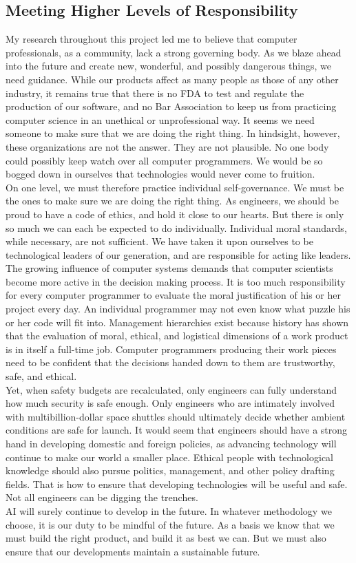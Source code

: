 \subsection{Meeting Higher Levels of Responsibility}
My research throughout this project led me to believe that computer professionals,
as a community, lack a strong governing body. As we blaze ahead into the future and
create new, wonderful, and possibly dangerous things, we need guidance. While our
products affect as many people as those of any other industry, it remains true that there is
no FDA to test and regulate the production of our software, and no Bar Association to
keep us from practicing computer science in an unethical or unprofessional way. It
seems we need someone to make sure that we are doing the right thing. In hindsight,
however, these organizations are not the answer. They are not plausible. No one body could possibly keep watch over all computer programmers. We would be so bogged
down in ourselves that technologies would never come to fruition.\\
On one level, we must therefore practice individual self-governance. We must be
the ones to make sure we are doing the right thing. As engineers, we should be proud to
have a code of ethics, and hold it close to our hearts. But there is only so much we can
each be expected to do individually. Individual moral standards, while necessary, are not
sufficient. We have taken it upon ourselves to be technological leaders of our generation,
and are responsible for acting like leaders.\\
The growing influence of computer systems demands that computer scientists
become more active in the decision making process. It is too much responsibility for
every computer programmer to evaluate the moral justification of his or her project every
day. An individual programmer may not even know what puzzle his or her code will fit
into. Management hierarchies exist because history has shown that the evaluation of
moral, ethical, and logistical dimensions of a work product is in itself a full-time job.
Computer programmers producing their work pieces need to be confident that the
decisions handed down to them are trustworthy, safe, and ethical.\\
Yet, when safety budgets are recalculated, only engineers can fully understand
how much security is safe enough. Only engineers who are intimately involved with
multibillion-dollar space shuttles should ultimately decide whether ambient conditions
are safe for launch. It would seem that engineers should have a strong hand in
developing domestic and foreign policies, as advancing technology will continue to make
our world a smaller place. Ethical people with technological knowledge should also
pursue politics, management, and other policy drafting fields. That is how to ensure that developing technologies will be useful and safe. Not all engineers can be digging the
trenches.\\
AI will surely continue to develop in the future. In whatever methodology we
choose, it is our duty to be mindful of the future. As a basis we know that we must build
the right product, and build it as best we can. But we must also ensure that our
developments maintain a sustainable future.


